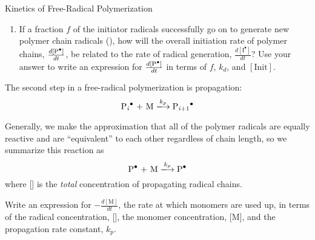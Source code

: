 \begin{activity}{Kinetics of Free-Radical Polymerization}
\begin{ctqs}
\begin{enumerate}
				\begin{solution}[1in]\end{solution}
		
			\item If a fraction $f$ of the initiator radicals successfully go on to generate new polymer chain radicals (), how will the overall initiation rate of polymer chains, $\frac{d[\text{\ce{P^.}}]}{dt}$, be related to the rate of radical generation, $\frac{d[\text{I}^\bullet]}{dt}$?  Use your answer to write an expression for $\frac{d[\text{\ce{P^.}}]}{dt}$ in terms of $f$, $k_d$, and $[\text{Init}]$.
		
				\begin{solution}[1.25in]\end{solution}
		
		\end{enumerate}
		
	\question The second step in a free-radical polymerization is propagation:
		\begin{equation*}
			\text{\ce{P_i^.} + M} \xlongrightarrow{k_p} \text{\ce{P_{i+1}^.}}
		\end{equation*}
		
		Generally, we make the approximation that all of the polymer radicals are equally reactive and are ``equivalent'' to each other regardless of chain length, so we summarize this reaction as
		\begin{equation*}
			\text{\ce{P^.} + M} \xlongrightarrow{k_p} \text{\ce{P^.}}
		\end{equation*}
		where [] is the \emph{total} concentration of propagating radical chains.
	
		Write an expression for $-\frac{d[\text{M}]}{dt}$, the rate at which monomers are used up, in terms of the radical concentration, [], the monomer concentration, [M], and the propagation rate constant, $k_p$.
		
		\begin{solution}[1.25in]\end{solution}
		

\end{ctqs}
\end{activity}
